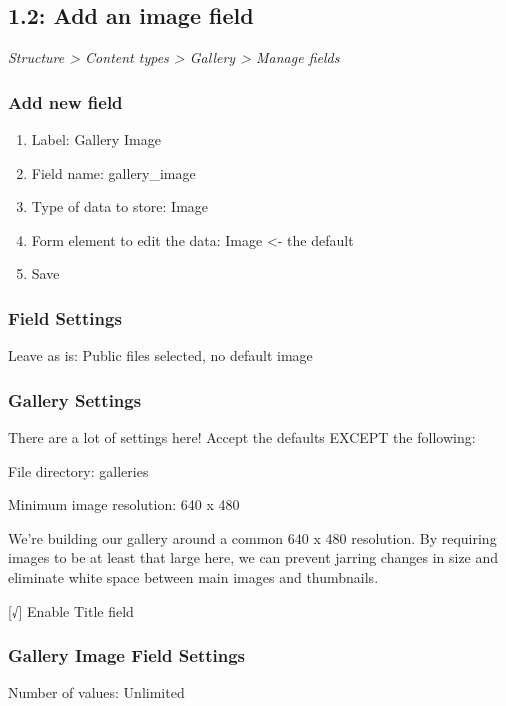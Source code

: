 \documentclass[letterpaper,10pt,english]{sphinxmanual}
\begin{document}
\subsection{1.2: Add an image field}
\label{slides:add-an-image-field}
\emph{Structure \textgreater{} Content types \textgreater{} Gallery \textgreater{} Manage fields}


\subsubsection{Add new field}
\label{slides:add-new-field}\begin{enumerate}
\item {} 
Label: Gallery Image

\item {} 
Field name: gallery\_image

\item {} 
Type of data to store: Image

\item {} 
Form element to edit the data: Image \textless{}- the default

\item {} 
Save

\end{enumerate}


\subsubsection{Field Settings}
\label{slides:field-settings}
Leave as is: Public files selected, no default image


\subsubsection{Gallery Settings}
\label{slides:gallery-settings}
There are a lot of settings here! Accept the defaults EXCEPT the following:

File directory: galleries

Minimum image resolution: 640 x 480

We’re building our gallery around a common 640 x 480 resolution. By requiring images to be at least that large here, we can prevent jarring changes in size and eliminate white space between main images and thumbnails.

{[}√{]} Enable Title field


\subsubsection{Gallery Image Field Settings}
\label{slides:gallery-image-field-settings}
Number of values: Unlimited
\end{document}
